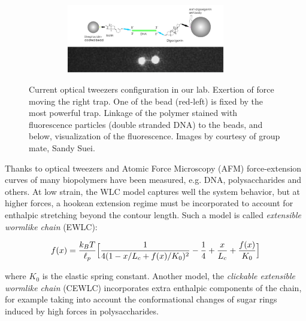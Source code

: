 \begin{figure}[ht]
\begin{minipage}{0.35\textwidth}
  \begin{subfigure}{0.99\textwidth}
    \includegraphics[width=0.9\textwidth,height=3cm]{Figures/chapter-intro/tweezers_linkage.png}%
    \caption{\label{tweezers-linkage}}
  \end{subfigure}
\end{minipage}

\caption[Optical Tweezers]{\protect{} Current
optical tweezers configuration in our lab. \protect{}
Exertion of force moving the right trap. One of the bead (red-left) is fixed by
the most powerful trap. \protect{} Linkage of the
 polymer stained with fluorescence particles (double stranded DNA) to the beads,
 and below, visualization of the fluorescence. Images by courtesy of group mate,
 Sandy Suei. }
\label{fig:optical_tweezers}
\end{figure}


Thanks to optical tweezers and Atomic Force Microscopy
(AFM)\citep{janshoff_force_2000} force-extension curves of many
biopolymers have been measured, e.g. DNA\citep{marko_stretching_1995},
polysaccharides\citep{marszalek_atomic_1999} and others. At low strain, the WLC
model captures well the system behavior, but at higher forces, a hookean
extension regime must be incorporated to account for enthalpic stretching
beyond the contour length.
Such a model is called \emph{extensible wormlike chain}
(EWLC)\citep{wang_stretching_1997}:

\begin{equation}\label{EWLC}
f(x)=\frac{k_B{}T}{\ell_p} \Big[ \frac{1}{4(1 - x/L_c + f(x)/K_0)^2}
-\frac{1}{4}+\frac{x}{L_c} + \frac{f(x)}{K_0}\Big]
\end{equation}


where $K_0$ is the elastic spring constant. Another model, the
\emph{clickable extensible wormlike chain} (CEWLC) incorporates extra
enthalpic components of the chain, for example taking into
account the conformational changes of sugar rings induced by high forces in polysaccharides\citep{haverkamp_model_2007}.


